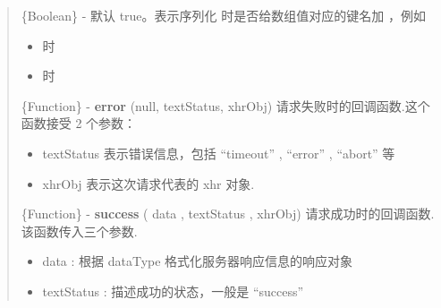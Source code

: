\documentclass[letterpaper,10pt,english]{sphinxmanual}
\begin{document}
\begin{quote}
\begin{fulllineitems}
\end{fulllineitems}



\begin{fulllineitems}
\label{api/core/ajax/io:io.cfg.serializeArray}
\{Boolean\} - 默认 true。表示序列化 {\hyperref[api/core/ajax/io:io.cfg.data]{}} 时是否给数组值对应的键名加 \code{{[}{]}} ，例如
\begin{itemize}
\item {}
 时  

\item {}
 时 

\end{itemize}

\end{fulllineitems}



\begin{fulllineitems}
\label{api/core/ajax/io:io.cfg.error}
\{Function\} -  \textbf{error} (null, textStatus, xhrObj) 请求失败时的回调函数.这个函数接受 2 个参数：
\begin{itemize}
\item {}
textStatus 表示错误信息，包括 ``timeout'' , ``error'' , ``abort'' 等

\item {}
xhrObj 表示这次请求代表的 xhr 对象.

\end{itemize}

\end{fulllineitems}



\begin{fulllineitems}
\label{api/core/ajax/io:io.cfg.success}
\{Function\} -  \textbf{success} ( data , textStatus , xhrObj) 请求成功时的回调函数.该函数传入三个参数.
\begin{itemize}
\item {}
data : 根据 dataType 格式化服务器响应信息的响应对象

\item {}
textStatus : 描述成功的状态，一般是 ``success''


\end{itemize}
\end{fulllineitems}
\end{quote}
\end{document}
